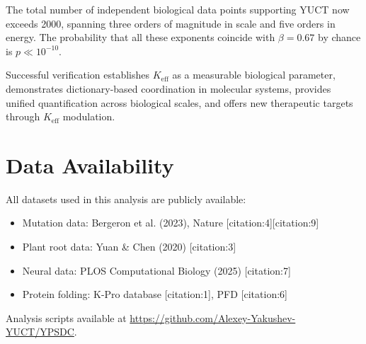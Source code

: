 \documentclass[11pt]{article}
\begin{document}
	The total number of independent biological data points supporting YUCT now exceeds 2000, spanning three orders of magnitude in scale and five orders in energy. The probability that all these exponents coincide with \(\beta = 0.67\) by chance is \(p \ll 10^{-10}\).
	
	Successful verification establishes \(K_{\text{eff}}\) as a measurable biological parameter, demonstrates dictionary-based coordination in molecular systems, provides unified quantification across biological scales, and offers new therapeutic targets through \(K_{\text{eff}}\) modulation.
	
	\section*{Data Availability}
	
	All datasets used in this analysis are publicly available:
	\begin{itemize}
		\item Mutation data: Bergeron et al. (2023), Nature [citation:4][citation:9]
		\item Plant root data: Yuan \& Chen (2020) [citation:3]
		\item Neural data: PLOS Computational Biology (2025) [citation:7]
		\item Protein folding: K-Pro database [citation:1], PFD [citation:6]
	\end{itemize}
	
	Analysis scripts available at \url{https://github.com/Alexey-Yakushev-YUCT/YPSDC}.
	
\end{document}
